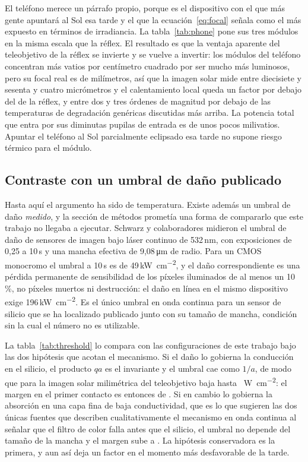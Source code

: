 \documentclass[10pt,a4paper]{article}
\begin{document}
El teléfono merece un párrafo propio, porque es el dispositivo con el que más
gente apuntará al Sol esa tarde y el que la ecuación~\eqref{eq:focal} señala
como el más expuesto en términos de irradiancia. La tabla~\ref{tab:phone} pone
sus tres módulos en la misma escala que la réflex. El resultado es que la
ventaja aparente del teleobjetivo de la réflex se invierte y se vuelve a
invertir: los módulos del teléfono concentran más vatios por centímetro cuadrado
por ser mucho más luminosos, pero su focal real es de milímetros, así que la
imagen solar mide entre diecisiete y sesenta y cuatro micrómetros y el
calentamiento local queda un factor \phoneRatio{} por debajo del de la réflex, y
entre dos y tres órdenes de magnitud por debajo de las temperaturas de
degradación genéricas discutidas más arriba. La potencia total que entra por sus diminutas pupilas de entrada
es de unos pocos milivatios. Apuntar el teléfono al Sol parcialmente eclipsado
esa tarde no supone riesgo térmico para el módulo.



\subsection{Contraste con un umbral de daño publicado}

Hasta aquí el argumento ha sido de temperatura. Existe además un umbral de daño
\emph{medido}, y la sección de métodos prometía una forma de compararlo que este
trabajo no llegaba a ejecutar. Schwarz y colaboradores \cite{schwarz2017}
midieron el umbral de daño de sensores de imagen bajo láser continuo de 532\,nm,
con exposiciones de 0,25 a 10\,s y una mancha efectiva de 9,08\,\si{\micro\meter}
de radio. Para un CMOS monocromo el umbral a 10\,s es de
49\,\si{\kilo\watt\per\square\centi\meter}, y el daño correspondiente es una
pérdida permanente de sensibilidad de los píxeles iluminados de al menos un
10\,\%, no píxeles muertos ni destrucción: el daño en línea en el mismo
dispositivo exige 196\,\si{\kilo\watt\per\square\centi\meter}. Es el único
umbral en onda continua para un sensor de silicio que se ha localizado publicado
junto con su tamaño de mancha, condición sin la cual el número no es utilizable.

La tabla~\ref{tab:threshold} lo compara con las configuraciones de este trabajo
bajo las dos hipótesis que acotan el mecanismo. Si el daño lo gobierna la
conducción en el silicio, el producto $qa$ es el invariante y el umbral cae como
$1/a$, de modo que para la imagen solar milimétrica del teleobjetivo baja hasta
\threshA~\si{\watt\per\square\centi\meter}: el margen en el primer contacto es
entonces de \marginA{}. Si en cambio lo gobierna la absorción en una capa fina
de baja conductividad, que es lo que sugieren las dos únicas fuentes que
describen cualitativamente el mecanismo en onda continua \cite{yoon2016,kim2015}
al señalar que el filtro de color falla antes que el silicio, el umbral no
depende del tamaño de la mancha y el margen sube a \marginB{}. La hipótesis
conservadora es la primera, y aun así deja un factor \marginA{} en el momento
más desfavorable de la tarde.
\end{document}
